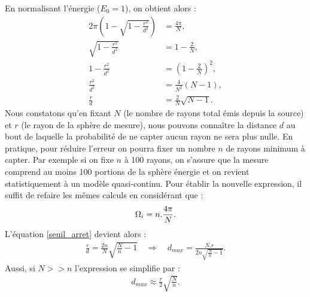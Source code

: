%
En normalisant l'énergie ($E_0 = 1$), on obtient alors :
%
\begin{align} 
	2\pi \left(1-\sqrt{1-\frac{r^2}{d^2}} \right) &= \frac{4\pi}{N} \nonumber,\\	
	\sqrt{1-\frac{r^2}{d^2}} &= 1-\frac{2}{N} \nonumber,\\
	1-\frac{r^2}{d^2} &= \left(1-\frac{2}{N}\right)^2 \nonumber,\\
	\frac{r^2}{d^2} &= \frac{4}{N^2}(N-1) \nonumber,\\
	 \frac{r}{d} &=  \frac{2}{N} \sqrt{N-1}. \label{seuil_arret}
\end{align}
%
Nous constatons qu'en fixant $N$ (le nombre de rayons total émis depuis la source) et $r$ (le rayon de la sphère de mesure), nous pouvons connaître la distance $d$ au bout de laquelle la probabilité de ne capter aucun rayon ne sera plus nulle. En pratique, pour réduire l'erreur on pourra fixer un nombre $n$ de rayons minimum à capter. Par exemple si on fixe $n$ à 100 rayons, on s'assure que la mesure comprend au moins 100 portions de la sphère énergie et on revient statistiquement à un modèle quasi-continu. Pour établir la nouvelle expression, il suffit de refaire les mêmes calculs en considérant que :
\begin{equation}
	\Omega_i = n.\frac{4\pi}{N}. \\
\end{equation}
%
L'équation \ref{seuil_arret} devient alors :
\begin{align} 
	\frac{r}{d} =  \frac{2n}{N} \sqrt{\frac{N}{n}-1} %
 	\quad \Rightarrow  \quad %
	 d_{max} =  \frac{N.r}{2n\sqrt{\frac{N}{n}-1}}.
\end{align}
%
Aussi, si $N >> n$ l'expression se simplifie par : 
\begin{align} \label{eq_dmax}
	 d_{max} \approx  \frac{r}{2} \sqrt{\frac{N}{n}}.
\end{align}
